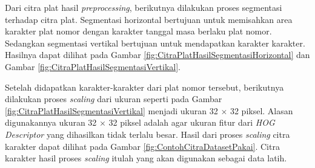 \noindent Dari citra plat hasil \textit{preprocessing}, berikutnya dilakukan proses segmentasi terhadap citra plat. Segmentasi horizontal bertujuan untuk memisahkan area karakter plat nomor dengan karakter tanggal masa berlaku plat nomor. Sedangkan segmentasi vertikal bertujuan untuk mendapatkan karakter karakter. Hasilnya dapat dilihat pada Gambar \ref{fig:CitraPlatHasilSegmentasiHorizontal} dan Gambar \ref{fig:CitraPlatHasilSegmentasiVertikal}.

\begin{adjustbox}{width=1\textwidth}
	\noindent
	\begin{minipage}{\linewidth}
		\label{fig:CitraPlatHasilSegmentasiHorizontal}
	\end{minipage}
\end{adjustbox}

\begin{adjustbox}{width=1\textwidth}
	\noindent\begin{minipage}{\linewidth}
		\label{fig:CitraPlatHasilSegmentasiVertikal}
	\end{minipage}
\end{adjustbox}

\noindent Setelah didapatkan karakter-karakter dari plat nomor tersebut, berikutnya dilakukan proses \textit{scaling} dari ukuran seperti pada Gambar \ref{fig:CitraPlatHasilSegmentasiVertikal} menjadi ukuran 32 $\times$ 32 piksel. Alasan digunakannya ukuran 32 $\times$ 32 piksel adalah agar ukuran fitur dari \textit{HOG Descriptor} yang dihasilkan tidak terlalu besar. Hasil dari proses \textit{scaling} citra karakter dapat dilihat pada Gambar \ref{fig:ContohCitraDatasetPakai}. Citra karakter hasil proses \textit{scaling} itulah yang akan digunakan sebagai data latih.

